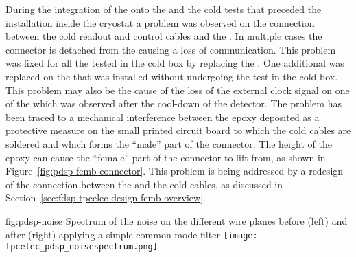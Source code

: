 During the integration of the  onto the 
and the cold tests that preceded the  installation
inside the  cryostat a problem was observed on the 
connection between the cold readout and control cables and the
. In multiple cases the connector is detached from
the  causing a loss of communication. This problem 
was fixed for all the  tested in the cold box by
replacing the . One additional  was 
replaced on the  that was installed without undergoing 
the test in the cold box. This problem may also be the cause
of the loss of the external clock signal on one of the 
which was observed after the cool-down of the detector.
The problem has been traced to a mechanical interference between 
the epoxy deposited as a protective measure on the small printed circuit
board to which the cold cables are soldered and which forms the
``male'' part of the connector. The height of the epoxy can cause
the ``female'' part of the connector to lift from, as shown in
Figure~\ref{fig:pdsp-femb-connector}. This problem is being 
addressed by a redesign of the connection between the 
and the cold cables, as discussed in Section~\ref{sec:fdsp-tpcelec-design-femb-overview}.

\begin{dunefigure}
{fig:pdsp-noise}
{Spectrum of the noise on the different   wire planes before
(left) and after (right) applying a simple common mode filter}
\texttt{[image: tpcelec\_pdsp\_noisespectrum.png]}
\end{dunefigure}

